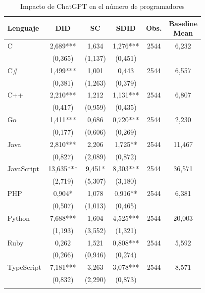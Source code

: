 \begin{table}[htbp]\centering
\caption{Impacto de ChatGPT en el n\'{u}mero de programadores}
\label{tab:tabla3}
{\def\sym#1{\ifmmode^{#1}\else\(^{#1}\)\fi}
\begin{tabular}{lccccc}
\toprule
Lenguaje & DID & SC & SDID & Obs. & \shortstack{Baseline \\ Mean} \\
\midrule
C & 2{,}689*** & 1{,}634 & 1{,}276*** & 2544 & 6{,}232 \\
              & (0{,}365) & (1{,}137) & (0{,}451) & & \\
\addlinespace
C\# & 1{,}499*** & 1{,}001 & 0{,}443 & 2544 & 6{,}557 \\
              & (0{,}381) & (1{,}263) & (0{,}379) & & \\
\addlinespace
C++ & 2{,}210*** & 1{,}212 & 1{,}131*** & 2544 & 6{,}807 \\
              & (0{,}417) & (0{,}959) & (0{,}435) & & \\
\addlinespace
Go & 1{,}411*** & 0{,}686 & 0{,}720*** & 2544 & 2{,}230 \\
              & (0{,}177) & (0{,}606) & (0{,}269) & & \\
\addlinespace
Java & 2{,}810*** & 2{,}206 & 1{,}725** & 2544 & 11{,}467 \\
              & (0{,}827) & (2{,}089) & (0{,}872) & & \\
\addlinespace
JavaScript & 13{,}635*** & 9{,}451* & 8{,}303*** & 2544 & 36{,}571 \\
              & (2{,}719) & (5{,}307) & (3{,}180) & & \\
\addlinespace
PHP & 0{,}904* & 1{,}078 & 0{,}916** & 2544 & 6{,}381 \\
              & (0{,}507) & (1{,}013) & (0{,}465) & & \\
\addlinespace
Python & 7{,}688*** & 1{,}604 & 4{,}525*** & 2544 & 20{,}003 \\
              & (1{,}193) & (3{,}552) & (1{,}321) & & \\
\addlinespace
Ruby & 0{,}262 & 1{,}521 & 0{,}808*** & 2544 & 5{,}592 \\
              & (0{,}266) & (0{,}946) & (0{,}274) & & \\
\addlinespace
TypeScript & 7{,}181*** & 3{,}263 & 3{,}078*** & 2544 & 8{,}571 \\
              & (0{,}832) & (2{,}290) & (0{,}873) & & \\
\addlinespace
\bottomrule
\end{tabular}}

\end{table}
